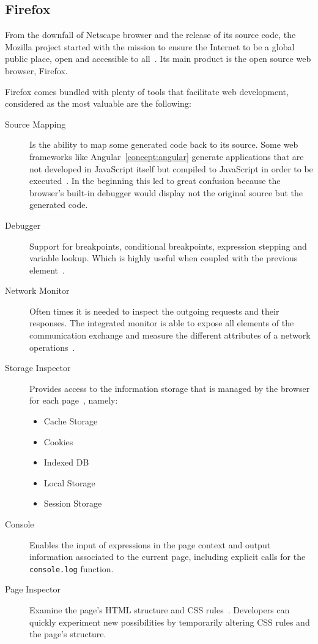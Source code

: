 \subsection{Firefox}
From the downfall of Netscape browser and the release of its source code, the Mozilla project started with the mission to ensure the Internet to be a global public place, open and accessible to all~\cite{firemission}. Its main product is the open source web browser, Firefox.

Firefox comes bundled with plenty of tools that facilitate web development, considered as the most valuable are the following:
\begin{description}
\item [Source Mapping] Is the ability to map some generated code back to its source. Some web frameworks like Angular~\ref{concept:angular} generate applications that are not developed in JavaScript itself but compiled to JavaScript in order to be executed~\cite{srcmapping}. In the beginning this led to great confusion because the browser's built-in debugger would display not the original source but the generated code.
\item [Debugger] Support for breakpoints, conditional breakpoints, expression stepping and variable lookup. Which is highly useful when coupled with the previous element~\cite{dbgmodernweb}.
\item [Network Monitor] Often times it is needed to inspect the outgoing requests and their responses. The integrated monitor is able to expose all elements of the communication exchange and measure the different attributes of a network operations~\cite{networkmon}.
\item [Storage Inspector] Provides access to the information storage that is managed by the browser for each page~\cite{storageinspector}, namely:
  \begin{itemize}
  \item Cache Storage
  \item Cookies
  \item Indexed \gls{DB}
  \item Local Storage
  \item Session Storage
  \end{itemize}
\item [Console] Enables the input of expressions in the page context and output information associated to the current page, including explicit calls for the \texttt{console.log} function.
\item [Page Inspector] Examine the page's \gls{HTML} structure and \gls{CSS} rules~\cite{inspector}. Developers can quickly experiment new possibilities by temporarily altering \gls{CSS} rules and the page's structure.
\end{description}

